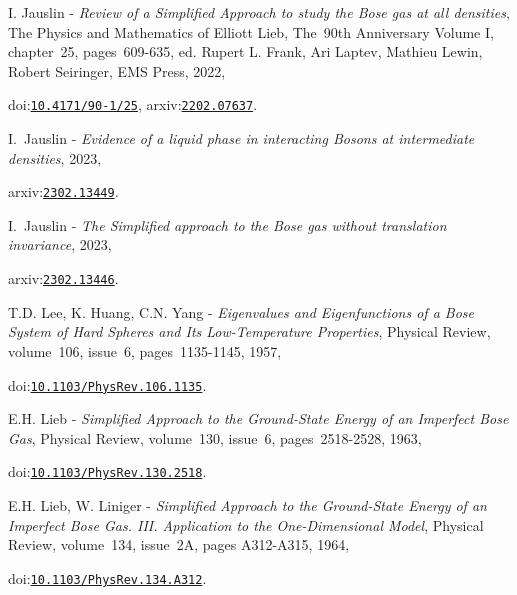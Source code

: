 I. Jauslin - {\it Review of a Simplified Approach to study the Bose gas at all densities}, The Physics and Mathematics of Elliott Lieb, The\-~90th Anniversary Volume I, chapter\-~25, pages\-~609-635, ed. Rupert L. Frank, Ari Laptev, Mathieu Lewin, Robert Seiringer, EMS Press, 2022,\par{}
doi:{\tt\color{blue}\href{http://dx.doi.org/10.4171/90-1/25}{10.4171/90-1/25}}, arxiv:{\tt\color{blue}\href{http://arxiv.org/abs/2202.07637}{2202.07637}}.\par\medskip
 
I.\-~Jauslin - {\it Evidence of a liquid phase in interacting Bosons at intermediate densities}, 2023,\par{}
arxiv:{\tt\color{blue}\href{http://arxiv.org/abs/2302.13449}{2302.13449}}.\par\medskip
 
I.\-~Jauslin - {\it The Simplified approach to the Bose gas without translation invariance}, 2023,\par{}
arxiv:{\tt\color{blue}\href{http://arxiv.org/abs/2302.13446}{2302.13446}}.\par\medskip
 
T.D. Lee, K. Huang, C.N. Yang - {\it Eigenvalues and Eigenfunctions of a Bose System of Hard Spheres and Its Low-Temperature Properties}, Physical Review, volume\-~106, issue\-~6, pages\-~1135-1145, 1957,\par{}
doi:{\tt\color{blue}\href{http://dx.doi.org/10.1103/PhysRev.106.1135}{10.1103/PhysRev.106.1135}}.\par\medskip
 
E.H. Lieb - {\it Simplified Approach to the Ground-State Energy of an Imperfect Bose Gas}, Physical Review, volume\-~130, issue\-~6, pages\-~2518-2528, 1963,\par{}
doi:{\tt\color{blue}\href{http://dx.doi.org/10.1103/PhysRev.130.2518}{10.1103/PhysRev.130.2518}}.\par\medskip
 
E.H. Lieb, W. Liniger - {\it Simplified Approach to the Ground-State Energy of an Imperfect Bose Gas. III. Application to the One-Dimensional Model}, Physical Review, volume\-~134, issue\-~2A, pages A312-A315, 1964,\par{}
doi:{\tt\color{blue}\href{http://dx.doi.org/10.1103/PhysRev.134.A312}{10.1103/PhysRev.134.A312}}.\par\medskip
 

